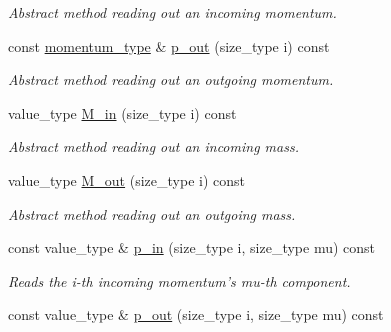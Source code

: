 \begin{DoxyCompactItemize}
\begin{DoxyCompactList}\small\item\em Abstract method reading out an incoming momentum. \end{DoxyCompactList}\item 
\hypertarget{a00529_a1814975d91cf8557553b0c7837efa701}{const \hyperlink{a00559}{momentum\-\_\-type} \& \hyperlink{a00529_a1814975d91cf8557553b0c7837efa701}{p\-\_\-out} (size\-\_\-type i) const }\label{a00529_a1814975d91cf8557553b0c7837efa701}

\begin{DoxyCompactList}\small\item\em Abstract method reading out an outgoing momentum. \end{DoxyCompactList}\item 
\hypertarget{a00529_a012809a8d53889ddfde2366a96dad270}{value\-\_\-type \hyperlink{a00529_a012809a8d53889ddfde2366a96dad270}{M\-\_\-in} (size\-\_\-type i) const }\label{a00529_a012809a8d53889ddfde2366a96dad270}

\begin{DoxyCompactList}\small\item\em Abstract method reading out an incoming mass. \end{DoxyCompactList}\item 
\hypertarget{a00529_a4dcd463da5393779dcf6f325f4ed4c2d}{value\-\_\-type \hyperlink{a00529_a4dcd463da5393779dcf6f325f4ed4c2d}{M\-\_\-out} (size\-\_\-type i) const }\label{a00529_a4dcd463da5393779dcf6f325f4ed4c2d}

\begin{DoxyCompactList}\small\item\em Abstract method reading out an outgoing mass. \end{DoxyCompactList}\item 
\hypertarget{a00529_abd55d011bd1512b10f7b177dee803119}{const value\-\_\-type \& \hyperlink{a00529_abd55d011bd1512b10f7b177dee803119}{p\-\_\-in} (size\-\_\-type i, size\-\_\-type mu) const }\label{a00529_abd55d011bd1512b10f7b177dee803119}

\begin{DoxyCompactList}\small\item\em Reads the i-\/th incoming momentum's mu-\/th component. \end{DoxyCompactList}\item 
\hypertarget{a00529_a4a86879a5dafe541b12a6cd133464e41}{const value\-\_\-type \& \hyperlink{a00529_a4a86879a5dafe541b12a6cd133464e41}{p\-\_\-out} (size\-\_\-type i, size\-\_\-type mu) const }\label{a00529_a4a86879a5dafe541b12a6cd133464e41}


\end{DoxyCompactItemize}
